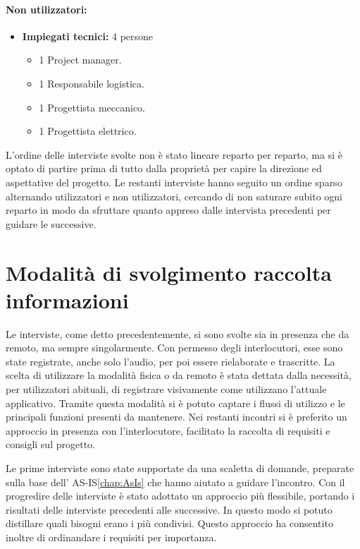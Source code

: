 \paragraph{Non utilizzatori:}
\begin{itemize}
    \item \textbf{Impiegati tecnici:} 4 persone
    \begin{itemize}
        \item 1 Project manager.
        \item 1 Responsabile logistica.
        \item 1 Progettista meccanico.
        \item 1 Progettista elettrico.
    \end{itemize}
\end{itemize}
L'ordine delle interviste svolte non è stato lineare reparto per reparto, ma si è optato di partire prima di tutto
dalla proprietà per capire la direzione ed aspettative del progetto.
Le restanti interviste hanno seguito un ordine sparso alternando 
utilizzatori e non utilizzatori, cercando di non saturare subito ogni reparto in modo da sfruttare quanto appreso
dalle intervista precedenti per guidare le successive.

\section{Modalità di svolgimento raccolta informazioni}
Le interviste, come detto precedentemente, si sono svolte sia in presenza che da remoto, ma sempre singolarmente.
Con permesso degli interlocutori, esse sono state registrate, anche solo l'audio, per poi essere rielaborate e 
trascritte.
La scelta di utilizzare la modalità fisica o da remoto è stata dettata dalla necessità, per utilizzatori abituali, 
di registrare visivamente come utilizzano l'attuale applicativo. Tramite questa modalità si è potuto captare i flussi di utilizzo e 
le principali funzioni presenti da mantenere.
Nei restanti incontri si è preferito un approccio in presenza con l'interlocutore,
 facilitato la raccolta di requisiti e consigli sul progetto.

Le prime interviste sono state supportate da una scaletta di domande, preparate sulla base dell' AS-IS\ref{chap:AsIs} che hanno aiutato
a guidare l'incontro.
Con il progredire delle interviste è stato adottato un approccio più flessibile, portando i risultati
delle interviste precedenti alle successive. In questo modo si potuto distillare quali bisogni erano i più condivisi.
Questo approccio ha consentito inoltre di ordinandare i requisiti per importanza.


